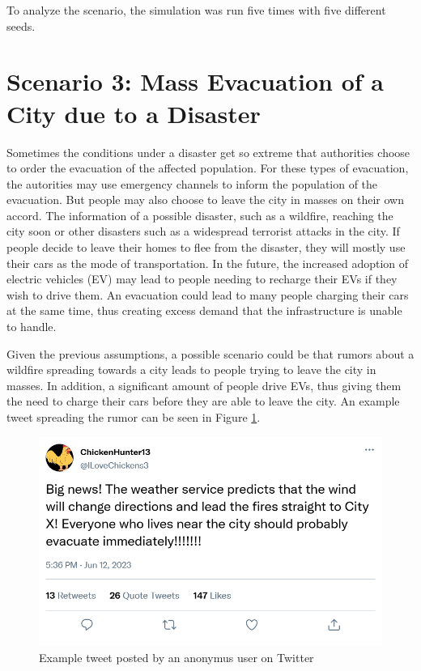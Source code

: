 To analyze the scenario, the simulation was run five times with five 
different seeds. 
\section{Scenario 3: Mass Evacuation of a City due to a Disaster}

Sometimes the conditions under a disaster get so extreme that 
authorities choose to order the evacuation of the affected population.
For these types of evacuation, the autorities may use emergency channels 
to inform the population of the evacuation.
But people may also choose to leave the city in masses on their own accord.
The information of a possible disaster, such as a wildfire, reaching the
city soon or other disasters such as a widespread terrorist attacks 
in the city.
If people decide to leave their homes to flee from the disaster, they 
will mostly use their cars as the mode of transportation.
In the future, the increased adoption of electric vehicles (EV)
may lead to people needing to recharge their EVs if they wish 
to drive them. An evacuation could lead to many people charging
their cars at the same time, thus creating excess demand that 
the infrastructure is unable to handle. 

Given the previous assumptions, a possible scenario could be that 
rumors about a wildfire spreading towards a city leads to people
trying to leave the city in masses. In addition, a significant 
amount of people drive EVs, thus giving them the need to charge
their cars before they are able to leave the city. An example
tweet spreading the rumor can be seen in Figure \ref{firetweet}.


\begin{figure}[!ht]
    \center
    \includegraphics[scale=.4]{figs/firenews.png}
    \caption{Example tweet posted by an anonymus user on Twitter}
    \label{firetweet}
\end{figure}

